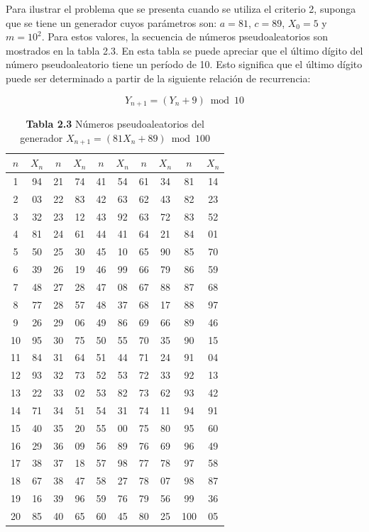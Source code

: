 \documentclass[11pt,letterpaper]{report}
\begin{document}
Para ilustrar el problema que se presenta cuando se utiliza el criterio
2, suponga que se tiene un generador cuyos parámetros son: $a=81$,
$c=89$, $X_0=5$ y $m=10^2$. Para estos valores, la secuencia de números
pseudoaleatorios son mostrados en la tabla 2.3. En esta tabla se puede
apreciar que el último dígito del número pseudoaleatorio tiene un
período de 10. Esto significa que el último dígito puede ser determinado
a partir de la siguiente relación de recurrencia:

\begin{equation}
Y_{n+1} = (Y_n + 9) \bmod 10
\end{equation}

\begin{table}[H]
\centering
\caption*{\textbf{Tabla 2.3} Números pseudoaleatorios del generador $X_{n+1} = (81X_n + 89) \bmod 100$}
\begin{tabular}{cccccccccc}
\toprule
$n$ & $X_n$ & $n$ & $X_n$ & $n$ & $X_n$ & $n$ & $X_n$ & $n$ & $X_n$ \\
\midrule
1 & 94 & 21 & 74 & 41 & 54 & 61 & 34 & 81 & 14 \\
2 & 03 & 22 & 83 & 42 & 63 & 62 & 43 & 82 & 23 \\
3 & 32 & 23 & 12 & 43 & 92 & 63 & 72 & 83 & 52 \\
4 & 81 & 24 & 61 & 44 & 41 & 64 & 21 & 84 & 01 \\
5 & 50 & 25 & 30 & 45 & 10 & 65 & 90 & 85 & 70 \\
6 & 39 & 26 & 19 & 46 & 99 & 66 & 79 & 86 & 59 \\
7 & 48 & 27 & 28 & 47 & 08 & 67 & 88 & 87 & 68 \\
8 & 77 & 28 & 57 & 48 & 37 & 68 & 17 & 88 & 97 \\
9 & 26 & 29 & 06 & 49 & 86 & 69 & 66 & 89 & 46 \\
10 & 95 & 30 & 75 & 50 & 55 & 70 & 35 & 90 & 15 \\
11 & 84 & 31 & 64 & 51 & 44 & 71 & 24 & 91 & 04 \\
12 & 93 & 32 & 73 & 52 & 53 & 72 & 33 & 92 & 13 \\
13 & 22 & 33 & 02 & 53 & 82 & 73 & 62 & 93 & 42 \\
14 & 71 & 34 & 51 & 54 & 31 & 74 & 11 & 94 & 91 \\
15 & 40 & 35 & 20 & 55 & 00 & 75 & 80 & 95 & 60 \\
16 & 29 & 36 & 09 & 56 & 89 & 76 & 69 & 96 & 49 \\
17 & 38 & 37 & 18 & 57 & 98 & 77 & 78 & 97 & 58 \\
18 & 67 & 38 & 47 & 58 & 27 & 78 & 07 & 98 & 87 \\
19 & 16 & 39 & 96 & 59 & 76 & 79 & 56 & 99 & 36 \\
20 & 85 & 40 & 65 & 60 & 45 & 80 & 25 & 100 & 05 \\
\bottomrule
\end{tabular}
\end{table}
\end{document}
